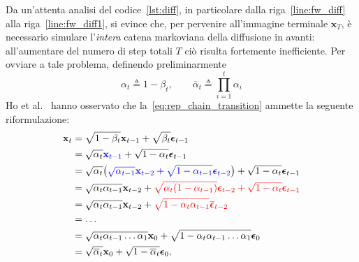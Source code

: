 Da un'attenta analisi del codice~\ref{lst:diff}, in particolare dalla riga~\ref{line:fw_diff} alla riga~\ref{line:fw_diff1}, si evince 
che, per pervenire all'immagine terminale $\mathbf{x}_T$, è necessario simulare l'\emph{intera} catena markoviana della diffusione in avanti:
all'aumentare del numero di step totali $T$ ciò risulta fortemente inefficiente.
Per ovviare a tale problema, definendo preliminarmente
\begin{equation}
  \alpha_t \triangleq  1-\beta_t, \quad\quad \overline{\alpha}_t  \triangleq \prod\limits_{i=1}^{t}\alpha_i \label{eq:alphas}
\end{equation} 
Ho et al.~\cite{ho2020} hanno osservato che la~\eqref{eq:rep_chain_transition} ammette la seguente riformulazione:
\begin{align}
\mathbf{x}_t & = \sqrt{1-\beta_t}\mathbf{x}_{t-1}+\sqrt{\beta_t}\bm{\epsilon}_{t-1}  \label{eq:eff_forward1}   \\ 
             & = \sqrt{\alpha_t}\mathcolor{blue}{\mathbf{x}_{t-1}}+\sqrt{1-\alpha_t}\bm{\epsilon}_{t-1}  \label{eq:eff_forward2}   \\ 
             & = \sqrt{\alpha_t}\bigl(\mathcolor{blue}{\sqrt{\alpha_{t-1}}\mathbf{x}_{t-2}+\sqrt{1-\alpha_{t-1}}\bm{\epsilon}_{t-2}}\bigr) + \sqrt{1-\alpha_t}\bm{\epsilon}_{t-1} \label{eq:eff_forward3}\\
             & = \sqrt{\alpha_t\alpha_{t-1}}\mathbf{x}_{t-2}+\mathcolor{red}{\sqrt{\alpha_t(1-\alpha_{t-1})}\bm{\epsilon}_{t-2}+\sqrt{1-\alpha_t}\bm{\epsilon}_{t-1}} \label{eq:eff_forward4}\\ 
             & = \sqrt{\alpha_t\alpha_{t-1}}\mathbf{x}_{t-2} + \mathcolor{red}{\sqrt{1-\alpha_t\alpha_{t-1}}\overline{\bm{\epsilon}}_{t-2}} \label{eq:eff_forward5} \\
             & = \dots \\
             & = \sqrt{\alpha_t\alpha_{t-1}\dots\alpha_1}\mathbf{x}_0 + \sqrt{1-\alpha_t\alpha_{t-1}\dots\alpha_1}\bm{\epsilon}_0 \\
             & = \sqrt{\overline{\alpha}_t}\mathbf{x}_0+\sqrt{1-\overline{\alpha}_t}\bm{\epsilon}_0, \label{eq:eff_forward}  
\end{align}

